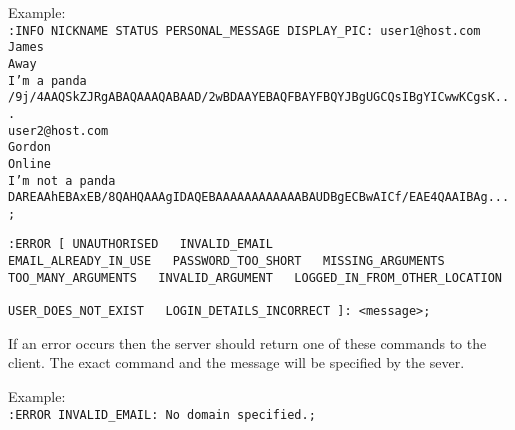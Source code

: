 Example: \\

\texttt{:INFO NICKNAME STATUS PERSONAL\_MESSAGE DISPLAY\_PIC: user1@host.com \\
James \\
Away \\
I’m a panda \\
/9j/4AAQSkZJRgABAQAAAQABAAD/2wBDAAYEBAQFBAYFBQYJBgUGCQsIBgYICwwKCgsK... \\
user2@host.com \\
Gordon \\
Online \\
I’m not a panda \\
DAREAAhEBAxEB/8QAHQAAAgIDAQEBAAAAAAAAAAAABAUDBgECBwAICf/EAE4QAAIBAg...;}

\texttt{:ERROR [ UNAUTHORISED \ \vline \ INVALID\_EMAIL \ \vline \ \\ EMAIL\_ALREADY\_IN\_USE \ \vline \ PASSWORD\_TOO\_SHORT \ \vline \ MISSING\_ARGUMENTS \ \vline \ \\ TOO\_MANY\_ARGUMENTS \ \vline \ INVALID\_ARGUMENT \ \vline \ LOGGED\_IN\_FROM\_OTHER\_LOCATION \ \vline \ \\ USER\_DOES\_NOT\_EXIST \ \vline \ LOGIN\_DETAILS\_INCORRECT ]: <message>;}

If an error occurs then the server should return one of these commands to the client. The exact command and the message will be specified by the sever.

Example: \\
\texttt{:ERROR INVALID\_EMAIL: No domain specified.;}

